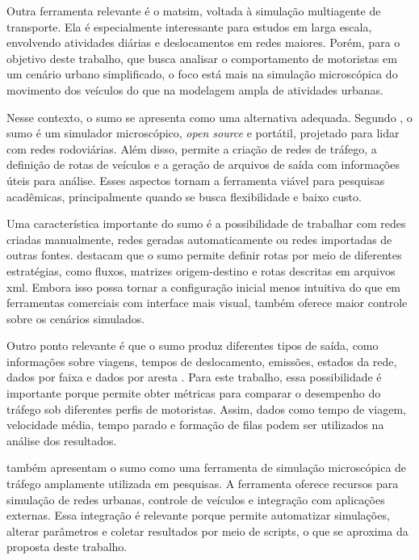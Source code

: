 Outra ferramenta relevante é o \gls{matsim}, voltada à simulação multiagente de transporte. Ela é especialmente interessante para estudos em larga escala, envolvendo atividades diárias e deslocamentos em redes maiores. Porém, para o objetivo deste trabalho, que busca analisar o comportamento de motoristas em um cenário urbano simplificado, o foco está mais na simulação microscópica do movimento dos veículos do que na modelagem ampla de atividades urbanas.

Nesse contexto, o \gls{sumo} se apresenta como uma alternativa adequada. Segundo , o \gls{sumo} é um simulador microscópico, \textit{open source} e portátil, projetado para lidar com redes rodoviárias. Além disso, permite a criação de redes de tráfego, a definição de rotas de veículos e a geração de arquivos de saída com informações úteis para análise. Esses aspectos tornam a ferramenta viável para pesquisas acadêmicas, principalmente quando se busca flexibilidade e baixo custo.

Uma característica importante do \gls{sumo} é a possibilidade de trabalhar com redes criadas manualmente, redes geradas automaticamente ou redes importadas de outras fontes.  destacam que o \gls{sumo} permite definir rotas por meio de diferentes estratégias, como fluxos, matrizes origem-destino e rotas descritas em arquivos \gls{xml}. Embora isso possa tornar a configuração inicial menos intuitiva do que em ferramentas comerciais com interface mais visual, também oferece maior controle sobre os cenários simulados.

Outro ponto relevante é que o \gls{sumo} produz diferentes tipos de saída, como informações sobre viagens, tempos de deslocamento, emissões, estados da rede, dados por faixa e dados por aresta \cite{kotusevski_2009}. Para este trabalho, essa possibilidade é importante porque permite obter métricas para comparar o desempenho do tráfego sob diferentes perfis de motoristas. Assim, dados como tempo de viagem, velocidade média, tempo parado e formação de filas podem ser utilizados na análise dos resultados.

 também apresentam o \gls{sumo} como uma ferramenta de simulação microscópica de tráfego amplamente utilizada em pesquisas. A ferramenta oferece recursos para simulação de redes urbanas, controle de veículos e integração com aplicações externas. Essa integração é relevante porque permite automatizar simulações, alterar parâmetros e coletar resultados por meio de scripts, o que se aproxima da proposta deste trabalho.

